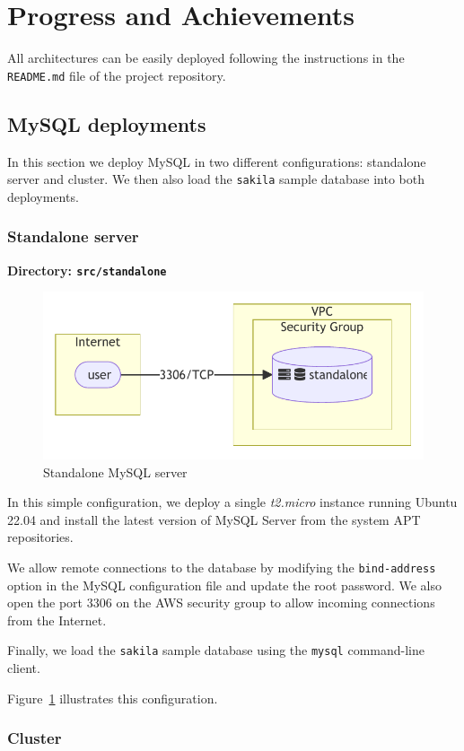 \documentclass[letterpaper,headings=standardclasses,parskip=half]{scrartcl}
\begin{document}
\section{Progress and Achievements}

All architectures can be easily deployed following the instructions in the \texttt{README.md} file of the project repository.

\subsection{MySQL deployments}

In this section we deploy MySQL in two different configurations: standalone server and cluster. We then also load the \texttt{sakila} sample database into both deployments.

\subsubsection{Standalone server}

\textbf{Directory: \texttt{src/standalone}}

\begin{figure}[h]
    \centering
    \includegraphics[width=0.5\linewidth]{figures/standalone.mmd.pdf}
    \caption{Standalone MySQL server}
    \label{fig:standalone}
\end{figure}

In this simple configuration, we deploy a single \textit{t2.micro} instance running Ubuntu 22.04 and install the latest version of MySQL Server from the system APT repositories.

We allow remote connections to the database by modifying the \texttt{bind-address} option in the MySQL configuration file and update the root password. We also open the port 3306 on the AWS security group to allow incoming connections from the Internet.

Finally, we load the \texttt{sakila} sample database using the \texttt{mysql} command-line client.

Figure~\ref{fig:standalone} illustrates this configuration.

\subsubsection{Cluster}
\end{document}
